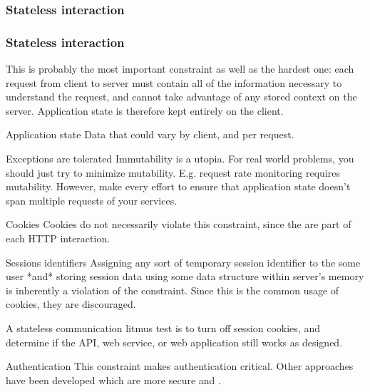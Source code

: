 \subsubsection{Stateless interaction}

\begin{frame}[allowframebreaks]
	\frametitle{Stateless interaction}
	
	This is probably the most important constraint as well as the hardest one: each request from client to server must contain all of the information necessary to understand the request, and cannot take advantage of any stored context on the server. Application state is therefore kept entirely on the client.
	
	\begin{block}{Application state}
		Data that could vary by client, and per request.
	\end{block}
	
	\begin{block}{Exceptions are tolerated}
		Immutability is a utopia. For real world problems, you should just try to minimize mutability. E.g. request rate monitoring requires mutability. 
		However, make every effort to ensure that application state doesn't span multiple requests of your services.
		
	\end{block}
	
	\framebreak
	
	\begin{block}{Cookies}
		Cookies do not necessarily violate this constraint, since the are part of each HTTP interaction.
	\end{block}
	
	\begin{alertblock}{Sessions identifiers}
		Assigning any sort of temporary session identifier to the some user *and* storing session data using some data structure within server's memory is inherently a violation of the constraint.
		Since this is the common usage of cookies, they are discouraged.
	\end{alertblock}
	
	\begin{example}
		A stateless communication litmus test is to turn off session cookies, and determine if the API, web service, or web application still works as designed.
	\end{example}
	
	\framebreak
		
	\begin{block}{Authentication}
		This constraint makes authentication critical. Other approaches have been developed which are more secure and \restful. 
	\end{block}
	

\end{frame}
